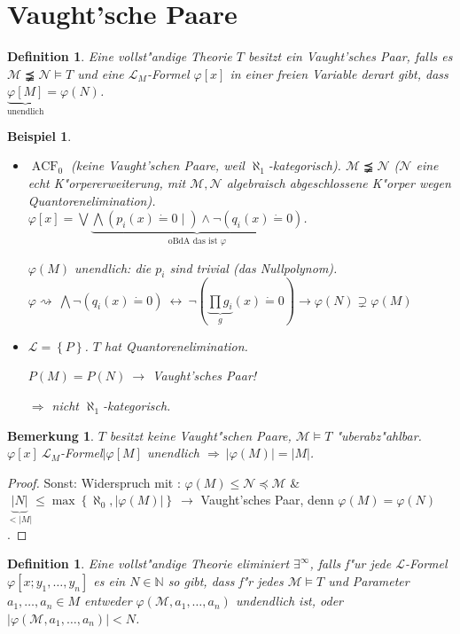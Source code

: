 \documentclass[a4paper,12pt,numbers=noenddot,parskip=full]{scrartcl}
\newcommand{\setN}{\mathbb{N}}
\newcommand{\scrL}{\mathcal{L}}
\newcommand{\scrM}{\mathcal{M}}
\newcommand{\scrN}{\mathcal{N}}
\DeclareMathOperator{\acf}{ACF}
\theoremstyle{dotless}
\newtheorem{definition}[theorem]{Definition}
\newtheorem{example}[theorem]{Beispiel}
\newtheorem{remark}[theorem]{Bemerkung}
\begin{document}
\section{Vaught'sche Paare}
\begin{definition}
	Eine vollst"andige Theorie $T$ besitzt ein \emph{Vaught'sches Paar}, falls es $\scrM \precneqq \scrN \models T$ und eine $\scrL_M$-Formel $\varphi[x]$ in einer freien Variable derart gibt, dass $\underbrace{\varphi[M]}_\text{unendlich} = \varphi(N)$.
\end{definition}
\begin{example}
	\begin{itemize}
		\item $\acf_0$ (keine Vaught'schen Paare, weil $\aleph_1$-kategorisch). $\scrM \precneqq \scrN$ ($\scrN$ eine echt K"orpererweiterung, mit $\scrM,\scrN$ algebraisch abgeschlossene K"orper wegen Quantorenelimination).\\
		$\varphi[x] = \bigvee \underbrace{\bigwedge(p_i(x) \dot= 0 \mid) \land \lnot (q_i(x) \dot= 0)}_{\text{oBdA das ist }\varphi}$.
		
		$\varphi(M)$ unendlich: die $p_i$ sind \emph{trivial} (das Nullpolynom). \\
		$\varphi \rightsquigarrow~ \bigwedge \lnot (q_i(x) \dot= 0)~ \leftrightarrow~ \lnot\left(\underbrace{\prod g_i}_{g}(x) \dot= 0\right) \rightarrow \varphi(N) \supsetneq \varphi(M)$
		
		\item $\scrL = \left\{P\right\}$. %
		$T$ hat Quantorenelimination.
		
		$P(M) = P(N)~ \rightarrow$ Vaught'sches Paar!
		
		$\Rightarrow$ nicht $\aleph_1$-kategorisch.
		
	\end{itemize}
\end{example}
\begin{remark}
	$T$ besitzt keine Vaught"schen Paare, $\scrM \models T$ "uberabz"ahlbar. 			$\varphi[x]~\scrL_M$-Formel$\mid \varphi[M]$ unendlich $\Rightarrow~|\varphi(M)| = |M|$.
\end{remark}
\begin{proof}
	Sonst: Widerspruch mit : $\varphi(M) \leq \scrN \preceq \scrM$ \& $\underbrace{|N|}_{< |M|} \leq \max\left\{\aleph_0, |\varphi(M)|\right\}~ \rightarrow$ Vaught'sches Paar, denn $\varphi(M) = \varphi(N)$.
\end{proof}
\begin{definition}
	Eine vollst"andige Theorie \emph{eliminiert $\exists^\infty$}, falls f"ur jede $\scrL$-Formel $\varphi[x;y_1, \dots, y_n]$ es ein $N \in \setN$ so gibt, dass f"r jedes $\scrM \models T$ und Parameter $a_1, \dots, a_n \in M$ entweder $\varphi(\scrM, a_1, \dots, a_n)$ undendlich ist, oder $|\varphi(\scrM, a_1, \dots, a_n)| < N$.
\end{definition}
\end{document}
